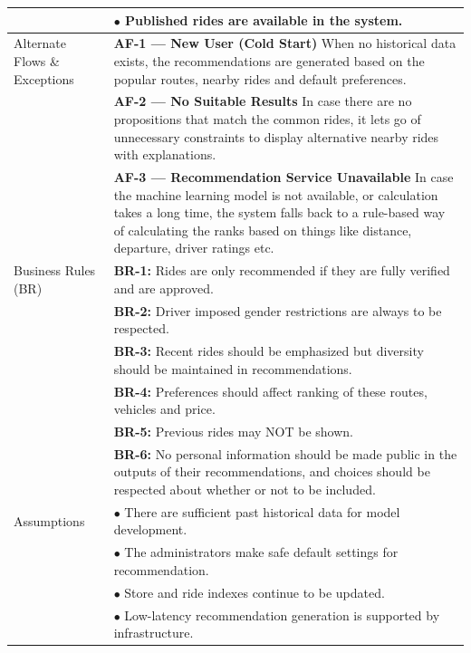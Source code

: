 \begin{longtable}{|>{\raggedright\arraybackslash}p{4cm}|>{\raggedright\arraybackslash}p{11cm}|}
& $\bullet$ Published rides are available in the system. \\
\hline
Alternate Flows \& Exceptions & \textbf{AF-1 — New User (Cold Start)} \newline When no historical data exists, the recommendations are generated based on the popular routes, nearby rides and default preferences. \\
& \textbf{AF-2 — No Suitable Results} \newline In case there are no propositions that match the common rides, it lets go of unnecessary constraints to display alternative nearby rides with explanations. \\
& \textbf{AF-3 — Recommendation Service Unavailable} \newline In case the machine learning model is not available, or calculation takes a long time, the system falls back to a rule-based way of calculating the ranks based on things like distance, departure, driver ratings etc. \\
\hline
Business Rules (BR) & \textbf{BR-1:} Rides are only recommended if they are fully verified and are approved. \\
& \textbf{BR-2:} Driver imposed gender restrictions are always to be respected. \\
& \textbf{BR-3:} Recent rides should be emphasized but diversity should be maintained in recommendations. \\
& \textbf{BR-4:} Preferences should affect ranking of these routes, vehicles and price. \\
& \textbf{BR-5:} Previous rides may NOT be shown. \\
& \textbf{BR-6:} No personal information should be made public in the outputs of their recommendations, and choices should be respected about whether or not to be included. \\
\hline
Assumptions & $\bullet$ There are sufficient past historical data for model development. \\
& $\bullet$ The administrators make safe default settings for recommendation. \\
& $\bullet$ Store and ride indexes continue to be updated. \\
& $\bullet$ Low-latency recommendation generation is supported by infrastructure. \\
\hline
\end{longtable}

